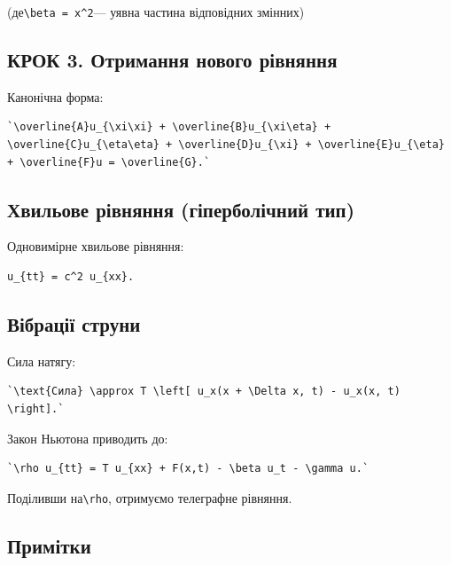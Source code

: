 \documentclass[
  ukrainian,
]{article}
\begin{document}
(де\texttt{\textbackslash{}beta\ =\ x\^{}2}--- уявна частина відповідних
змінних)

\subsection{КРОК 3. Отримання нового
рівняння}\label{ux43aux440ux43eux43a-3.-ux43eux442ux440ux438ux43cux430ux43dux43dux44f-ux43dux43eux432ux43eux433ux43e-ux440ux456ux432ux43dux44fux43dux43dux44f}

Канонічна форма:

\begin{verbatim}
`\overline{A}u_{\xi\xi} + \overline{B}u_{\xi\eta} + \overline{C}u_{\eta\eta} + \overline{D}u_{\xi} + \overline{E}u_{\eta} + \overline{F}u = \overline{G}.`
\end{verbatim}

\subsection{Хвильове рівняння (гіперболічний
тип)}\label{ux445ux432ux438ux43bux44cux43eux432ux435-ux440ux456ux432ux43dux44fux43dux43dux44f-ux433ux456ux43fux435ux440ux431ux43eux43bux456ux447ux43dux438ux439-ux442ux438ux43f}

Одновимірне хвильове рівняння:

\begin{verbatim}
u_{tt} = c^2 u_{xx}.
\end{verbatim}

\subsection{Вібрації
струни}\label{ux432ux456ux431ux440ux430ux446ux456ux457-ux441ux442ux440ux443ux43dux438}

Сила натягу:

\begin{verbatim}
`\text{Сила} \approx T \left[ u_x(x + \Delta x, t) - u_x(x, t) \right].`
\end{verbatim}

Закон Ньютона приводить до:

\begin{verbatim}
`\rho u_{tt} = T u_{xx} + F(x,t) - \beta u_t - \gamma u.`
\end{verbatim}

Поділивши на\texttt{\textbackslash{}rho}, отримуємо телеграфне рівняння.

\subsection{Примітки}\label{ux43fux440ux438ux43cux456ux442ux43aux438-2}
\end{document}
